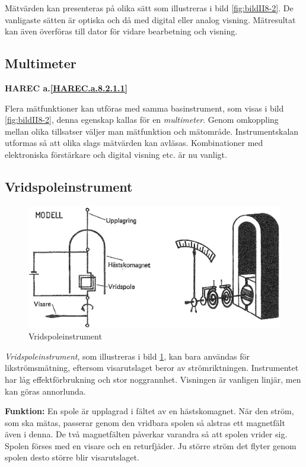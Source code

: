 Mätvärden kan presenteras på olika sätt som illustreras i bild
\ref{fig:bildII8-2}.
De vanligaste sätten är optiska och då med digital eller analog visning.
Mätresultat kan även överföras till dator för vidare bearbetning och visning.

\subsection{Multimeter}
\textbf{
HAREC a.\ref{HAREC.a.8.2.1.1}\label{myHAREC.a.8.2.1.1}
}


Flera mätfunktioner kan utföras med samma basinstrument, som visas i
bild \ref{fig:bildII8-2}, denna egenskap kallas för en \emph{multimeter}.
Genom omkoppling mellan olika tillsatser väljer man mätfunktion och mätområde.
Instrumentskalan utformas så att olika slags mätvärden kan avläsas.
Kombinationer med elektroniska förstärkare och digital visning etc. är nu
vanligt.

\subsection{Vridspoleinstrument}

\begin{figure}
  \includegraphics[width=\textwidth]{images/cropped_pdfs/bild_2_8-03.pdf}
  \caption{Vridspoleinstrument}
  \label{fig:bildII8-3}
\end{figure}

\emph{Vridspoleinstrument}, som illustreras i bild \ref{fig:bildII8-3}, kan
bara användas för likströmsmätning, eftersom visarutslaget beror av
strömriktningen.
Instrumentet har låg effektförbrukning och stor noggrannhet.
Visningen är vanligen linjär, men kan göras annorlunda.

\textbf{Funktion:}
En spole är upplagrad i fältet av en hästskomagnet.
När den ström, som ska mätas, passerar genom den vridbara spolen så alstras
ett magnetfält även i denna.
De två magnetfälten påverkar varandra så att spolen vrider sig.
Spolen förses med en visare och en returfjäder.
Ju större ström det flyter genom spolen desto större blir visarutslaget.

